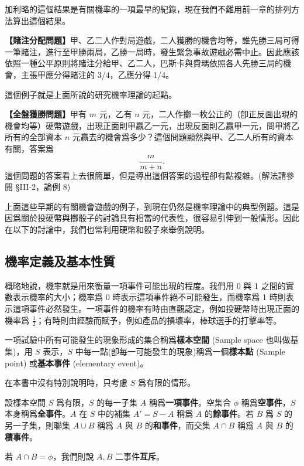 加利略的這個結果是有關機率的一項最早的紀錄，現在我們不難用前一章的排列方法算出這個結果。

\medskip
\noindent\textbf{【賭注分配問題】}甲、乙二人作對局遊戲，二人獲勝的機會均等，誰先勝三局可得一筆賭注，進行至甲勝兩局，乙勝一局時，發生緊急事故遊戲必需中止。因此應該依照一種公平原則將賭注分給甲、乙二人，巴斯卡與費瑪依照各人先勝三局的機會，主張甲應分得賭注的 3/4，乙應分得 1/4。

這個例子就是上面所說的研究機率理論的起點。

\medskip
\noindent\textbf{【全盤獲勝問題】}甲有 $m$ 元，乙有 $n$ 元，二人作擲一枚公正的（卽正反面出現的機會均等）硬幣遊戲，出現正面則甲贏乙一元，出現反面則乙贏甲一元，問甲將乙所有的全部資本 $n$ 元贏去的機會爲多少？這個問題顯然與甲、乙二人所有的資本有關，答案爲
\[
\frac{m}{m+n}.
\]
這個問題的答案看上去很簡單，但是導出這個答案的過程卻有點複雜。(解法請參閱 §III-2，論例 8)

上面這些早期的有關機會遊戲的例子，到現在仍然是機率理論中的典型例題。這是因爲關於投硬幣與擲骰子的討論具有相當的代表性，很容易引伸到一般情形。因此在以下的討論中，我們也常利用硬幣和骰子來舉例說明。

\subsection{機率定義及基本性質}\label{sec:b5-3-1}

概略地說，機率就是用來衡量一項事件可能出現的程度。我們用 0 與 1 之間的實數表示機率的大小；機率爲 0 時表示這項事件絕不可能發生，而機率爲 1 時則表示這項事件必然發生。一項事件的機率有時由直觀認定，例如投硬幣時出現正面的機率爲 $\frac{1}{2}$；有時則由經驗而賦予，例如產品的損壞率，棒球選手的打擊率等。

\medskip
\begin{definition*}
一項試驗中所有可能發生的現象形成的集合稱爲\textbf{樣本空間} (Sample space 也叫做基集)，用 $S$ 表示，$S$ 中每一點(卽每一可能發生的現象)稱爲一個\textbf{樣本點} (Sample point) 或\textbf{基本事件} (elementary event)。
\end{definition*}

在本書中沒有特別說明時，只考慮 $S$ 爲有限的情形。

\medskip
\begin{definition*}
設樣本空間 $S$ 爲有限，$S$ 的每一子集 $A$ 稱爲\textbf{一項事件}。空集合 $\phi$ 稱爲\textbf{空事件}，$S$ 本身稱爲\textbf{全事件}。$A$ 在 $S$ 中的補集 $A'=S-A$ 稱爲 $A$ 的\textbf{餘事件}。若 $B$ 爲 $S$ 的另一子集，則聯集 $A \cup B$ 稱爲 $A$ 與 $B$ 的\textbf{和事件}，而交集 $A \cap B$ 稱爲 $A$ 與 $B$ 的\textbf{積事件}。

若 $A \cap B = \phi$，我們則說 $A, B$ 二事件\textbf{互斥}。
\end{definition*}

